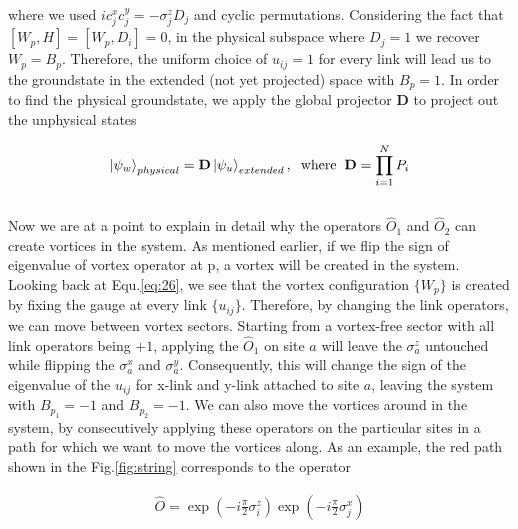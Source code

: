 \documentclass{article}
\begin{document}
where we used $i c^x_j c^y_j = -\sigma^z_j D_j$ and cyclic permutations. Considering the fact that $[W_p, H] = [W_p, D_i] = 0$, in the physical subspace where $D_j = 1$ we recover $W_p = B_p$. Therefore, the uniform choice of $u_{ij}=1$ for every link will lead us to the groundstate in the extended (not yet projected) space with $B_p = 1$. In order to find the physical groundstate, we apply the global projector $\mathbf{D}$ to project out the unphysical states

\begin{equation}\label{eq:28}
	\begin{aligned}
		\ket{\psi_w}_{physical} = \mathbf{D} \ket{\psi_u}_{extended},  \hspace{2mm}\text{where}\hspace{2mm} \mathbf{D} = \prod^N_{i=1} P_i
		\end{aligned}
\end{equation}\\

Now we are at a point to explain in detail why the operators $\hat{O}_1$ and $\hat{O}_2$ can create vortices in the system. As mentioned earlier, if we flip the sign of eigenvalue of vortex operator at p, a vortex will be created in the system. Looking back at Equ.\hspace{0.2mm}\ref{eq:26}, we see that the vortex configuration $\{W_p\}$ is created by fixing the gauge at every link $\{u_{ij}\}$. Therefore, by changing the link operators, we can move between vortex sectors. Starting from a vortex-free sector with all link operators being $+1$, applying the $\hat{O}_1$ on site $a$ will leave the $\sigma^z_a$ untouched while flipping the $\sigma^x_a$ and $\sigma^y_a$. Consequently, this will change the sign of the eigenvalue of the $u_{ij}$ for x-link and y-link attached to site $a$, leaving the system with $B_{p_1} = -1$ and $B_{p_2} = -1$. We can also move the vortices around in the system, by consecutively applying these operators on the particular sites in a path for which we want to move the vortices along. As an example, the red path shown in the Fig.\hspace{0.2mm}\ref{fig:string} corresponds to the operator

\begin{equation}\label{eq:29}
	\begin{aligned}
		\hat{O} = \exp{(-i\frac{\pi}{2}\sigma^z_i)} \exp{(-i\frac{\pi}{2}\sigma^x_j)}
		\end{aligned}
\end{equation}
\end{document}
